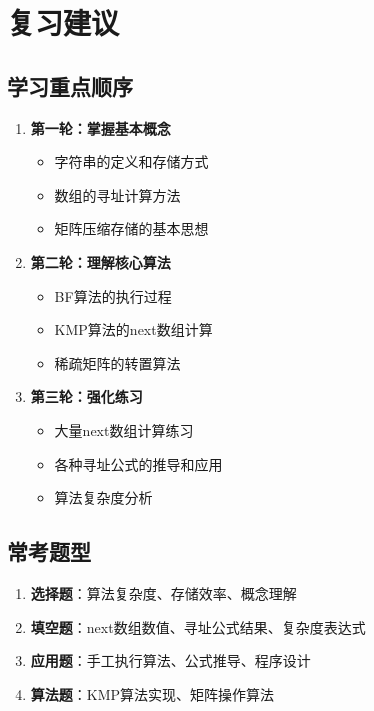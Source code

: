 \documentclass[12pt,a4paper]{amsart}
\begin{document}
\section{复习建议}

\subsection{学习重点顺序}
\begin{enumerate}
\item \textbf{第一轮：掌握基本概念}
    \begin{itemize}
    \item 字符串的定义和存储方式
    \item 数组的寻址计算方法
    \item 矩阵压缩存储的基本思想
    \end{itemize}
    
\item \textbf{第二轮：理解核心算法}
    \begin{itemize}
    \item BF算法的执行过程
    \item KMP算法的next数组计算
    \item 稀疏矩阵的转置算法
    \end{itemize}
    
\item \textbf{第三轮：强化练习}
    \begin{itemize}
    \item 大量next数组计算练习
    \item 各种寻址公式的推导和应用
    \item 算法复杂度分析
    \end{itemize}
\end{enumerate}

\subsection{常考题型}
\begin{enumerate}
\item \textbf{选择题}：算法复杂度、存储效率、概念理解
\item \textbf{填空题}：next数组数值、寻址公式结果、复杂度表达式
\item \textbf{应用题}：手工执行算法、公式推导、程序设计
\item \textbf{算法题}：KMP算法实现、矩阵操作算法
\end{enumerate}
\end{document}

